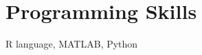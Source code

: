 \documentclass[letterpaper,11pt]{article}
\begin{document}
	\section{Programming Skills}
	 R language,  MATLAB, Python
\begin{comment}
	\section{References}
\begin{tabular}{lr}
	\begin{minipage}[t]{2.5in}
		Prof.\ Genevera I. Allen\\
		Rice University\\
		Location B\\
		Country and Postcode\\
		\Telefon\ +00 1 234 5678\\
		\Letter\ \href{mailto:X@A.ac.jp}{X\textrm{@}A.ac.jp}
	\end{minipage}
	&
	\begin{minipage}[t]{2.5in}
		Prof.\ X Y\\
		Place A\\
		Location B\\
		Country and Postcode\\
		\Telefon\ +00 1 234 5678\\
		\Letter\ \href{mailto:X@A.ac.jp}{X\textrm{@}A.ac.jp}
	\end{minipage}
\end{tabular}
\end{comment}
\end{document}
